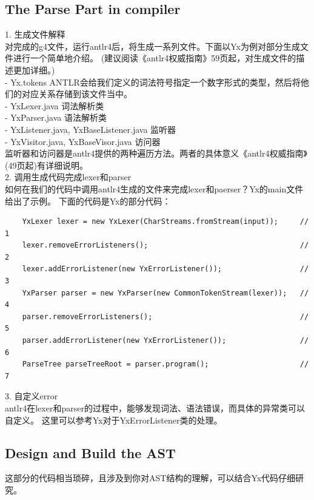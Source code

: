 \subsection{The Parse Part in compiler}
1. 生成文件解释 \\
对完成的g4文件，运行antlr4后，将生成一系列文件。下面以Yx为例对部分生成文件进行一个简单地介绍。
(建议阅读《antlr4权威指南》59页起，对生成文件的描述更加详细。) \\
 - Yx.tokens ANTLR会给我们定义的词法符号指定一个数字形式的类型，然后将他们的对应关系存储到该文件当中。\\
 - YxLexer.java 词法解析类 \\
 - YxParser.java 语法解析类 \\
 - YxListener.java, YxBaseListener.java 监听器 \\
 - YxVisitor.java, YxBaseVisor.java 访问器 \\
监听器和访问器是antlr4提供的两种遍历方法。两者的具体意义《antlr4权威指南》(49页起)有详细说明。\\

2. 调用生成代码完成lexer和parser \\
如何在我们的代码中调用antlr4生成的文件来完成lexer和paerser？Yx的main文件给出了示例。
下面的代码是Yx的部分代码：\\
\begin{lstlisting}
    YxLexer lexer = new YxLexer(CharStreams.fromStream(input));     // 1
    lexer.removeErrorListeners();                                   // 2
    lexer.addErrorListener(new YxErrorListener());                  // 3    
    YxParser parser = new YxParser(new CommonTokenStream(lexer));   // 4
    parser.removeErrorListeners();                                  // 5
    parser.addErrorListener(new YxErrorListener());                 // 6
    ParseTree parseTreeRoot = parser.program();                     // 7
\end{lstlisting}

3. 自定义error \\
antlr4在lexer和parser的过程中，能够发现词法、语法错误，而具体的异常类可以自定义。
这里可以参考Yx对于YxErrorListener类的处理。

\subsection{Design and Build the AST}
这部分的代码相当琐碎，且涉及到你对AST结构的理解，可以结合Yx代码仔细研究。

